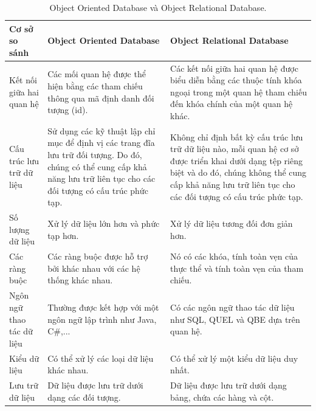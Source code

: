 \begin{table}[H]
    \centering
    \begin{tabular}{|m{3cm}|m{5cm}|m{5cm}|}
    \hline 
        \textbf{Cơ sở so sánh} & \textbf{Object Oriented Database} & \textbf{Object Relational Database}\\ \hline
        Kết nối giữa hai quan hệ 
        & Các mối quan hệ được thể hiện bằng các tham chiếu thông qua mã định danh đối tượng (id).
        & Các kết nối giữa hai quan hệ được biểu diễn bằng các thuộc tính khóa ngoại trong một quan hệ tham chiếu đến khóa chính của một quan hệ khác.\\ \hline
        Cấu trúc lưu trữ dữ liệu 
        & Sử dụng các kỹ thuật lập chỉ mục để định vị các trang đĩa lưu trữ đối tượng. Do đó, chúng có thể cung cấp khả năng lưu trữ liên tục cho các đối tượng có cấu trúc phức tạp. 
        & Không chỉ định bất kỳ cấu trúc lưu trữ dữ liệu nào, mỗi quan hệ cơ sở được triển khai dưới dạng tệp riêng biệt và do đó, chúng không thể cung cấp khả năng lưu trữ liên tục cho các đối tượng có cấu trúc phức tạp.\\ \hline
        Số lượng dữ liệu 
        & Xử lý dữ liệu lớn hơn và phức tạp hơn.
        & Xử lý dữ liệu tương đối đơn giản hơn.\\ \hline
        Các ràng buộc 
        & Các ràng buộc được hỗ trợ bởi khác nhau với các hệ thống khác nhau. 
        & Nó có các khóa, tính toàn vẹn của thực thể và tính toàn vẹn của tham chiếu.\\ \hline
        Ngôn ngữ thao tác dữ liệu 
        & Thường được kết hợp với một ngôn ngữ lập trình như Java, C\#,... 
        & Có các ngôn ngữ thao tác dữ liệu như SQL, QUEL và QBE dựa trên quan hệ.\\ \hline
        Kiểu dữ liệu 
        & Có thể xử lý các loại dữ liệu khác nhau.
        & Có thể xử lý một kiểu dữ liệu duy nhất.\\ \hline
        Lưu trữ dữ liệu 
        & Dữ liệu được lưu trữ dưới dạng các đối tượng.
        & Dữ liệu được lưu trữ dưới dạng bảng, chứa các hàng và cột.\\
    \hline 
    \end{tabular}
    \caption{Object Oriented Database và Object Relational Database.}
    \label{OOD and ORD}
\end{table}

